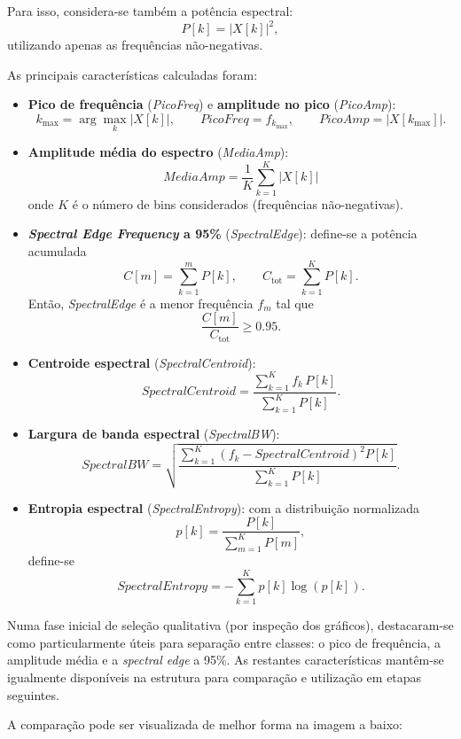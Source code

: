 \documentclass[12pt]{article}
\begin{document}
Para isso, considera-se também a potência espectral:
\[
P[k] = |X[k]|^2,
\]
utilizando apenas as frequências não-negativas.

As principais características calculadas foram:

\begin{itemize}
    \item \textbf{Pico de frequência} (\textit{PicoFreq}) e \textbf{amplitude no pico} (\textit{PicoAmp}):
    \[
    k_{\max}=\arg\max_k |X[k]|,\qquad \textit{PicoFreq}=f_{k_{\max}},\qquad \textit{PicoAmp}=|X[k_{\max}]|.
    \]

    \item \textbf{Amplitude média do espectro} (\textit{MediaAmp}):
    \[
    \textit{MediaAmp} = \frac{1}{K}\sum_{k=1}^{K} |X[k]|
    \]
    onde $K$ é o número de bins considerados (frequências não-negativas).

    \item \textbf{\textit{Spectral Edge Frequency} a 95\%} (\textit{SpectralEdge}): define-se a potência acumulada
    \[
    C[m]=\sum_{k=1}^{m} P[k],\qquad C_{\text{tot}}=\sum_{k=1}^{K}P[k].
    \]
    Então, \textit{SpectralEdge} é a menor frequência $f_m$ tal que
    \[
    \frac{C[m]}{C_{\text{tot}}}\ge 0.95.
    \]

    \item \textbf{Centroide espectral} (\textit{SpectralCentroid}):
    \[
    \textit{SpectralCentroid}=\frac{\sum_{k=1}^{K} f_k\,P[k]}{\sum_{k=1}^{K} P[k]}.
    \]

    \item \textbf{Largura de banda espectral} (\textit{SpectralBW}):
    \[
    \textit{SpectralBW}=\sqrt{\frac{\sum_{k=1}^{K}(f_k-\textit{SpectralCentroid})^2P[k]}{\sum_{k=1}^{K}P[k]}}.
    \]

    \item \textbf{Entropia espectral} (\textit{SpectralEntropy}): com a distribuição normalizada
    \[
    p[k]=\frac{P[k]}{\sum_{m=1}^{K}P[m]},
    \]
    define-se
    \[
    \textit{SpectralEntropy}=-\sum_{k=1}^{K} p[k]\log(p[k]).
    \]
\end{itemize}

Numa fase inicial de seleção qualitativa (por inspeção dos gráficos), destacaram-se como particularmente úteis para separação entre classes: o pico de frequência, a amplitude média e a \textit{spectral edge} a 95\%. As restantes características mantêm-se igualmente disponíveis na estrutura para comparação e utilização em etapas seguintes.

A comparação pode ser visualizada de melhor forma na imagem a baixo:
\end{document}
